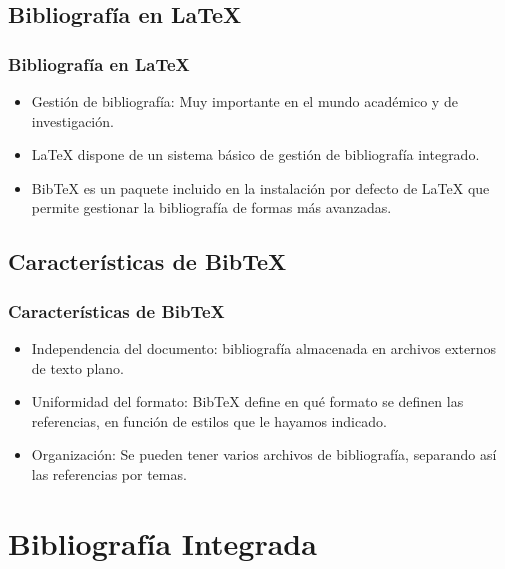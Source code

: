 \documentclass[aspectratio=43]{beamer}%
\begin{document}
\subsection{Bibliografía en \LaTeX{}}
\begin{frame}[fragile]
\frametitle{\textbf{Bibliografía en \LaTeX{}}}
\justifying
 \begin{itemize}\justifying
  \item Gestión de bibliografía: Muy importante en el mundo académico y de investigación.
  \item \LaTeX{} dispone de un sistema básico de gestión de bibliografía integrado.
  \item Bib\TeX{} es un paquete incluido en la instalación por defecto de \LaTeX{} que permite gestionar la bibliografía de formas más avanzadas.
\end{itemize}

\end{frame}

\subsection{Características de Bib\TeX{}}
\begin{frame}[fragile]
\frametitle{\textbf{Características de Bib\TeX{}}}
\justifying
 \begin{itemize}\justifying
  \item Independencia del documento: bibliografía almacenada en archivos externos de texto plano.
  \item Uniformidad del formato: Bib\TeX{} define en qué formato se definen las referencias, en función de estilos que le hayamos indicado.
  \item Organización: Se pueden tener varios archivos de bibliografía, separando así las referencias por temas.
\end{itemize}
\end{frame}


\section{Bibliografía Integrada}
\end{document}
